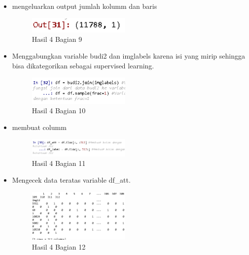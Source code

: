 \begin{itemize}
\item mengeluarkan output jumlah kolumm dan baris

\begin{figure}[H]
\centerline{\includegraphics[width=5cm]{figures/1174079/3/praktek11.PNG}}
\caption{Hasil 4 Bagian 9}
\label{labelgambar}
\end{figure}

\item Menggabungkan variable budi2 dan imglabels karena isi yang mirip sehingga bisa dikategorikan sebagai supervised learning.

\begin{figure}[H]
\centerline{\includegraphics[width=5cm]{figures/1174079/3/praktek12.PNG}}
\caption{Hasil 4 Bagian 10}
\label{labelgambar}
\end{figure}

\item membuat columm

\begin{figure}[H]
\centerline{\includegraphics[width=5cm]{figures/1174079/3/praktek13.PNG}}
\caption{Hasil 4 Bagian 11}
\label{labelgambar}
\end{figure}

\item Mengecek data teratas variable df\_att.

\begin{figure}[H]
\centerline{\includegraphics[width=5cm]{figures/1174079/3/praktek14.PNG}}
\caption{Hasil 4 Bagian 12}
\label{labelgambar}
\end{figure}


\end{itemize}
